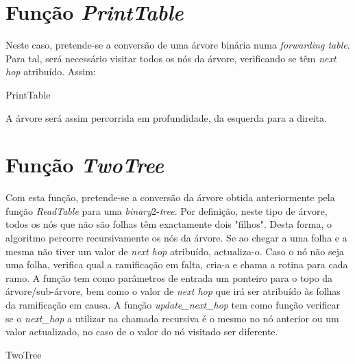 \documentclass[a4paper]{article}
\begin{document}
\section{Função \textit{PrintTable}}
Neste caso, pretende-se a conversão de uma árvore binária numa \textit{forwarding table}. Para tal, será necessário visitar todos os nós da árvore, verificando se têm \textit{next hop} atribuído. Assim:

\begin{algorithm}[H]
 \Return\;
 \caption{PrintTable}
\end{algorithm}
A árvore será assim percorrida em profundidade, da esquerda para a direita.

\section{Função \textit{TwoTree}}
Com esta função, pretende-se a conversão da árvore obtida anteriormente pela função \textit{ReadTable} para uma \textit{binary}2-\textit{tree}. Por definição, neste tipo de árvore, todos os nós que não são folhas têm exactamente dois "filhos". Desta forma, o algoritmo percorre recursivamente os nós da árvore. Se ao chegar a uma folha e a mesma não tiver um valor de \textit{next hop} atribuído, actualiza-o. Caso o nó não seja uma folha, verifica qual a ramificação em falta, cria-a e chama a rotina para cada ramo. A função tem como parâmetros de entrada um ponteiro para o topo da árvore/sub-árvore, bem como o valor de \textit{next hop} que irá ser atribuído às folhas da ramificação em  causa. A função \textit{update\_next\_hop} tem como função verificar se o \textit{next\_hop} a utilizar na chamada recursiva é o mesmo no nó anterior ou um valor actualizado, no caso de o valor do nó visitado ser diferente.

\begin{algorithm}[H]
 \Return\;
 \caption{TwoTree}
\end{algorithm}
\end{document}
